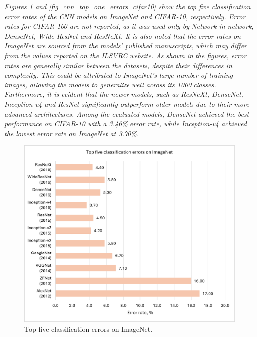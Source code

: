 \documentclass[preprint,12pt]{elsarticle}
\begin{document}
\emph{Figures \ref{fig_cnn_top_five_errors_imagenet} and \ref{fig_cnn_top_one_errors_cifar10} show the top five classification error rates of the CNN models on ImageNet and CIFAR-10, respectively. Error rates for CIFAR-100 are not reported, as it was used only by Network-in-network, DenseNet, Wide ResNet and ResNeXt. It is also noted that the error rates on ImageNet are sourced from the models' published manuscripts, which may differ from the values reported on the ILSVRC website. As shown in the figures, error rates are generally similar between the datasets, despite their differences in complexity. This could be attributed to ImageNet's large number of training images, allowing the models to generalize well across its 1000 classes. Furthermore, it is evident that the newer models, such as ResNeXt, DenseNet, Inception-v4 and ResNet significantly outperform older models due to their more advanced architectures. Among the evaluated models, DenseNet achieved the best performance on CIFAR-10 with a 3.46\% error rate, while Inception-v4 achieved the lowest error rate on ImageNet at 3.70\%.}

\begin{figure}[h!]
    \centering
    \includegraphics[scale=0.8]{fig_cnn_top_five_errors_imagenet.png}
    \caption{Top five classification errors on ImageNet.}
    \label{fig_cnn_top_five_errors_imagenet}
\end{figure}
\end{document}
